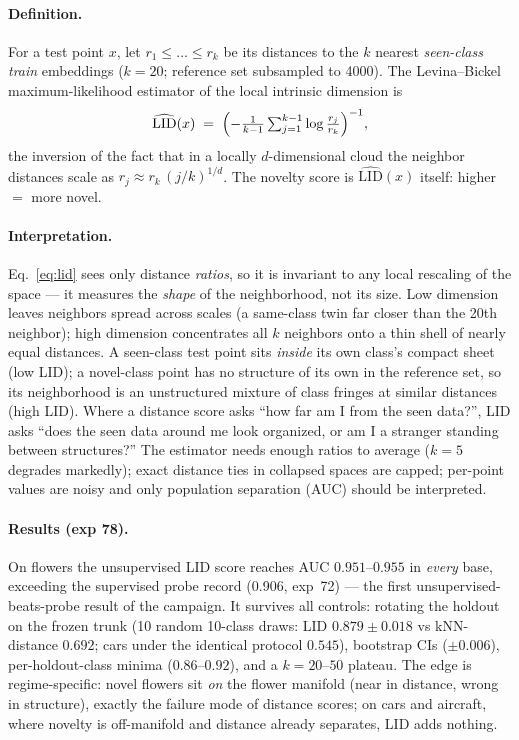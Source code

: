 \documentclass[11pt]{article}
\begin{document}
\paragraph{Definition.}
For a test point $x$, let $r_1 \le \dots \le r_k$ be its distances to
the $k$ nearest \emph{seen-class train} embeddings ($k{=}20$; reference
set subsampled to 4000).  The Levina--Bickel maximum-likelihood
estimator of the local intrinsic dimension is
\begin{equation}
\widehat{\mathrm{LID}}(x) \;=\;
\Bigl(-\tfrac{1}{k-1}\textstyle\sum_{j=1}^{k-1}
\log \tfrac{r_j}{r_k}\Bigr)^{-1},
\label{eq:lid}
\end{equation}
the inversion of the fact that in a locally $d$-dimensional cloud the
neighbor distances scale as $r_j \approx r_k\,(j/k)^{1/d}$.  The novelty
score is $\widehat{\mathrm{LID}}(x)$ itself: higher $=$ more novel.

\paragraph{Interpretation.}
Eq.~\eqref{eq:lid} sees only distance \emph{ratios}, so it is invariant
to any local rescaling of the space --- it measures the \emph{shape} of
the neighborhood, not its size.  Low dimension leaves neighbors spread
across scales (a same-class twin far closer than the 20th neighbor);
high dimension concentrates all $k$ neighbors onto a thin shell of
nearly equal distances.  A seen-class test point sits \emph{inside} its
own class's compact sheet (low LID); a novel-class point has no
structure of its own in the reference set, so its neighborhood is an
unstructured mixture of class fringes at similar distances (high LID).
Where a distance score asks ``how far am I from the seen data?'', LID
asks ``does the seen data around me look organized, or am I a stranger
standing between structures?''  The estimator needs enough ratios to
average ($k{=}5$ degrades markedly); exact distance ties in collapsed
spaces are capped; per-point values are noisy and only population
separation (AUC) should be interpreted.

\paragraph{Results (exp 78).}
On flowers the unsupervised LID score reaches AUC
$0.951$--$0.955$ in \emph{every} base, exceeding the supervised probe
record (0.906, exp~72) --- the first unsupervised-beats-probe result of
the campaign.  It survives all controls: rotating the holdout on the
frozen trunk (10 random 10-class draws: LID $0.879\pm0.018$ vs
kNN-distance $0.692$; cars under the identical protocol $0.545$),
bootstrap CIs ($\pm0.006$), per-holdout-class minima ($0.86$--$0.92$),
and a $k{=}20$--$50$ plateau.  The edge is regime-specific: novel
flowers sit \emph{on} the flower manifold (near in distance, wrong in
structure), exactly the failure mode of distance scores; on cars and
aircraft, where novelty is off-manifold and distance already separates,
LID adds nothing.
\end{document}
